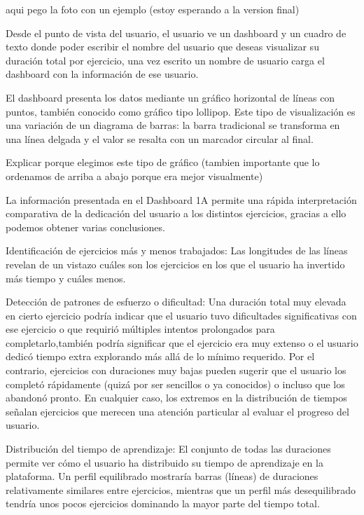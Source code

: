 \documentclass[a4paper, 12pt]{book}
\begin{document}
aqui pego la foto con un ejemplo (estoy esperando a la version final)

Desde el punto de vista del usuario, el usuario ve un dashboard y un cuadro de texto donde poder escribir el nombre del usuario que deseas visualizar su duración total por ejercicio, una vez escrito un nombre de usuario carga el dashboard con la información de ese usuario.

El dashboard presenta los datos mediante un gráfico horizontal de líneas con puntos, también conocido como gráfico tipo lollipop. Este tipo de visualización es una variación de un diagrama de barras: la barra tradicional se transforma en una línea delgada y el valor se resalta con un marcador circular al final.

Explicar porque elegimos este tipo de gráfico (tambien importante que lo ordenamos de arriba a abajo porque era mejor visualmente)

La información presentada en el Dashboard 1A permite una rápida interpretación comparativa de la dedicación del usuario a los distintos ejercicios, gracias a ello podemos obtener varias conclusiones.

Identificación de ejercicios más y menos trabajados: Las longitudes de las líneas revelan de un vistazo cuáles son los ejercicios en los que el usuario ha invertido más tiempo y cuáles menos.

Detección de patrones de esfuerzo o dificultad: Una duración total muy elevada en cierto ejercicio podría indicar que el usuario tuvo dificultades significativas con ese ejercicio o que requirió múltiples intentos prolongados para completarlo,también podría significar que el ejercicio era muy extenso o el usuario dedicó tiempo extra explorando más allá de lo mínimo requerido. Por el contrario, ejercicios con duraciones muy bajas pueden sugerir que el usuario los completó rápidamente (quizá por ser sencillos o ya conocidos) o incluso que los abandonó pronto. En cualquier caso, los extremos en la distribución de tiempos señalan ejercicios que merecen una atención particular al evaluar el progreso del usuario.

Distribución del tiempo de aprendizaje: El conjunto de todas las duraciones permite ver cómo el usuario ha distribuido su tiempo de aprendizaje en la plataforma. Un perfil equilibrado mostraría barras (líneas) de duraciones relativamente similares entre ejercicios, mientras que un perfil más desequilibrado tendría unos pocos ejercicios dominando la mayor parte del tiempo total.
\end{document}
